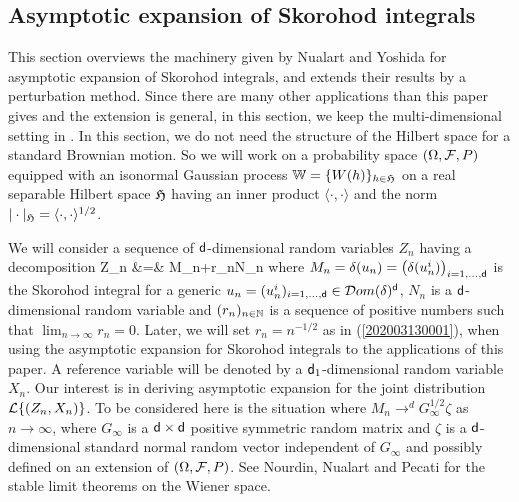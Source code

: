 \documentclass[a4paper,12pt]{article}
\numberwithin{equation}{section}
\numberwithin{equation}{section}
\newcommand{\sred}{\color[rgb]{0.8,0,0}}
\newcommand{\sred}{\color{black}}%
\def\sfd{{\sf d}}
\begin{document}
\subsection{Asymptotic expansion of Skorohod integrals}\label{202003141634}
This section overviews the machinery given by Nualart and Yoshida \cite{nualart2019asymptotic} 
for asymptotic expansion of Skorohod integrals, 
and extends their results {\sred by a perturbation method}. %
Since there are many other applications than this paper gives 
and the {\sred extension is} general, in this section, we keep the multi-dimensional setting 
in \cite{nualart2019asymptotic}. 
In this section, we do not need the structure of the Hilbert space for a standard Brownian motion. 
So we will work on a probability space $(\Omega,{\cal F},P)$ equipped with an isonormal Gaussian process 
${\mathbb W}=\{W(h)\}_{h\in{\mathfrak H}}$ on a real separable Hilbert space ${\mathfrak H}$ having an inner product 
$\langle\cdot,\cdot\rangle$ and the norm $|\cdot|_{\mathfrak H}=\langle\cdot,\cdot\rangle^{1/2}$. 
%

We will consider a sequence of $\sfd$-dimensional random variables $Z_n$ having a decomposition
\bea\label{202003291147}
Z_n &=& M_n+r_nN_n
\eea
where 
$M_n=\delta(u_n)=\big(\delta(u_n^i)\big)_{i=1,...,\sfd}$ is the Skorohod integral 
for {\sred a} %
generic $u_n=(u_n^i)_{i=1,...,\sfd}\in{\mathcal Dom}(\delta)^\sfd$, 
$N_n$ is a $\sfd$-dimensional random variable and 
$(r_n)_{n\in{\mathbb N}}$ is a sequence of positive numbers such that $\lim_{n\to\infty}r_n=0$. 
{\sred Later,} we will set $r_n=n^{-1/2}$ as in (\ref{202003130001}), 
when using the asymptotic expansion for Skorohod integrals to the applications of this paper. 
%
A reference variable will be denoted by a $\sfd_1$-dimensional random variable $X_n$. 
Our interest is in deriving asymptotic expansion for the joint distribution ${\cal L}\{(Z_n,X_n)\}$. 
To be considered here is the situation where $M_n\to^dG_\infty^{1/2}\zeta$ 
as $n\to\infty$, where $G_\infty$ is a $\sfd\times\sfd$ positive symmetric random matrix 
and $\zeta$ is a $\sfd$-dimensional standard normal random vector independent of $G_\infty$ and possibly defined on an extension of $(\Omega,{\cal F},P)$. 
See Nourdin, Nualart and Pecati \cite{nourdin2016quantitative} for 
the stable limit theorems on the Wiener space. 
\end{document}
